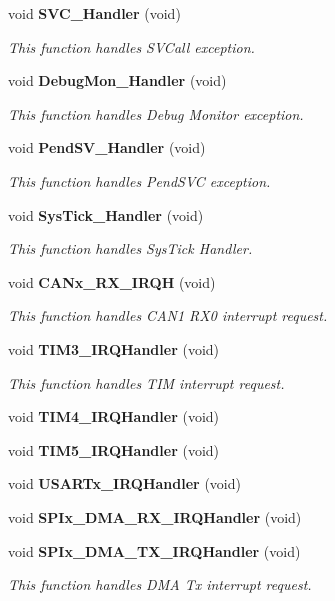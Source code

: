 \begin{DoxyCompactItemize}
void \textbf{ S\+V\+C\+\_\+\+Handler} (void)
\begin{DoxyCompactList}\small\item\em This function handles S\+V\+Call exception. \end{DoxyCompactList}\item 
void \textbf{ Debug\+Mon\+\_\+\+Handler} (void)
\begin{DoxyCompactList}\small\item\em This function handles Debug Monitor exception. \end{DoxyCompactList}\item 
void \textbf{ Pend\+S\+V\+\_\+\+Handler} (void)
\begin{DoxyCompactList}\small\item\em This function handles Pend\+S\+VC exception. \end{DoxyCompactList}\item 
void \textbf{ Sys\+Tick\+\_\+\+Handler} (void)
\begin{DoxyCompactList}\small\item\em This function handles Sys\+Tick Handler. \end{DoxyCompactList}\item 
void \textbf{ C\+A\+Nx\+\_\+\+R\+X\+\_\+\+I\+R\+QH} (void)
\begin{DoxyCompactList}\small\item\em This function handles C\+A\+N1 R\+X0 interrupt request. \end{DoxyCompactList}\item 
void \textbf{ T\+I\+M3\+\_\+\+I\+R\+Q\+Handler} (void)
\begin{DoxyCompactList}\small\item\em This function handles T\+IM interrupt request. \end{DoxyCompactList}\item 
void \textbf{ T\+I\+M4\+\_\+\+I\+R\+Q\+Handler} (void)
\item 
void \textbf{ T\+I\+M5\+\_\+\+I\+R\+Q\+Handler} (void)
\item 
void \textbf{ U\+S\+A\+R\+Tx\+\_\+\+I\+R\+Q\+Handler} (void)
\item 
void \textbf{ S\+P\+Ix\+\_\+\+D\+M\+A\+\_\+\+R\+X\+\_\+\+I\+R\+Q\+Handler} (void)
\item 
void \textbf{ S\+P\+Ix\+\_\+\+D\+M\+A\+\_\+\+T\+X\+\_\+\+I\+R\+Q\+Handler} (void)
\begin{DoxyCompactList}\small\item\em This function handles D\+MA Tx interrupt request. \end{DoxyCompactList}\end{DoxyCompactItemize}
